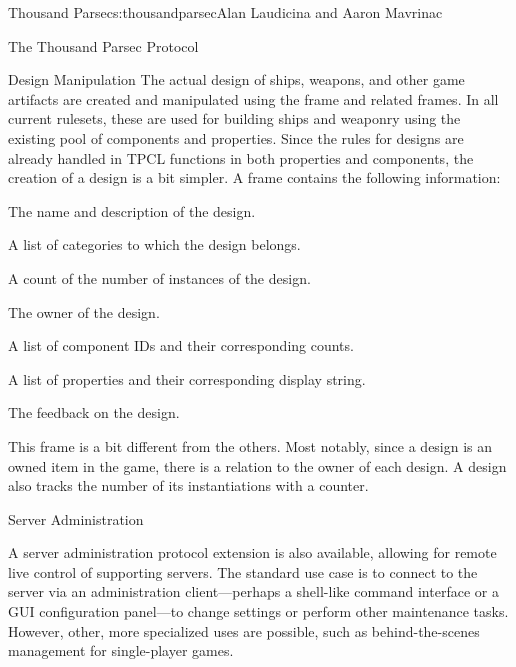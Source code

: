 \begin{aosachapter}{Thousand Parsec}{s:thousandparsec}{Alan Laudicina and Aaron Mavrinac}
\begin{aosasect1}{The Thousand Parsec Protocol}
\begin{aosasect2}{Design Manipulation}
The actual design of ships, weapons, and other game artifacts are
created and manipulated using the  frame and related
frames. In all current rulesets, these are used for building ships and
weaponry using the existing pool of components and properties. Since
the rules for designs are already handled in TPCL 
functions in both properties and components, the creation of a design
is a bit simpler. A  frame contains the following
information:

\begin{aosaitemize}

  \item The name and description of the design.

  \item A list of categories to which the design belongs.

  \item A count of the number of instances of the design.

  \item The owner of the design.

  \item A list of component IDs and their corresponding counts.

  \item A list of properties and their corresponding display string.

  \item The feedback on the design.

\end{aosaitemize}

This frame is a bit different from the others. Most notably, since a
design is an owned item in the game, there is a relation to the owner
of each design. A design also tracks the number of its instantiations
with a counter.

\end{aosasect2}

\begin{aosasect2}{Server Administration}

A server administration protocol extension is also available, allowing
for remote live control of supporting servers. The standard use case
is to connect to the server via an administration client---perhaps a
shell-like command interface or a GUI configuration panel---to change
settings or perform other maintenance tasks. However, other, more
specialized uses are possible, such as behind-the-scenes management
for single-player games.


\end{aosasect2}
\end{aosasect1}
\end{aosachapter}
